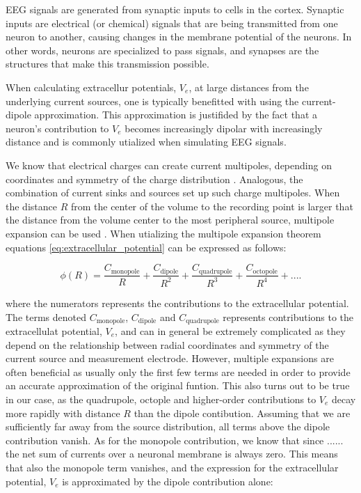 \documentclass[a4paper, UKenglish, 11pt]{uiomaster}
\begin{document}
EEG signals are generated from synaptic inputs to cells in the cortex. Synaptic inputs are electrical (or chemical) signals that are being transmitted from one neuron to another, causing changes in the membrane potential of the neurons. In other words, neurons are specialized to pass signals, and synapses are the structures that make this transmission possible.

When calculating extracellur potentials, $V_e$, at large distances from the underlying current sources, one is typically benefitted with using the current-dipole approximation. This approximation is justifided by the fact that a neuron's contribution to $V_e$ becomes increasingly dipolar with increasingly distance and is commonly utialized when simulating EEG signals.

We know that electrical charges can create current multipoles, depending on coordinates and symmetry of the charge distribution \cite{wiki:multipoles}. Analogous, the combination of current sinks and sources set up such charge multipoles.
When the distance $R$ from the center of the volume to the recording point is larger that the distance from the volume center to the most peripheral source, multipole expansion can be used \cite{jackson1999classical}. When utializing the multipole expansion theorem equations \ref{eq:extracellular_potential} can be expressed as follows:

\begin{equation}
  \phi(R) = \frac{C_{\text{monopole}}}{R} + \frac{C_{\text{dipole}}}{R^2} + \frac{C_{\text{quadrupole}}}{R^3} + \frac{C_{\text{octopole}}}{R^4} + ... .
\label{eq:extracellular_potential}
\end{equation}

where the numerators represents the contributions to the extracellular potential. The terms denoted $C_\text{monopole}$, $C_\text{dipole}$ and $C_\text{quadrupole}$ represents contributions to the extracellulat potential, $V_e$, and can in general be extremely complicated as they depend on the relationship between radial coordinates and symmetry of the current source and measurement electrode. However, multiple expansions are often beneficial as usually only the first few terms are needed in order to provide an accurate approximation of the original funtion. This also turns out to be true in our case, as the quadrupole, octople and higher-order contributions to $V_e$ decay more rapidly with distance $R$ than the dipole contibution. Assuming that we are sufficiently far away from the source distribution, all terms above the dipole contribution vanish. As for the monopole contribution, we know that since ...... the net sum of currents over a neuronal membrane is always zero. This means that also the monopole term vanishes, and the expression for the extracellular potential, $V_e$ is approximated by the dipole contribution alone:
\end{document}
